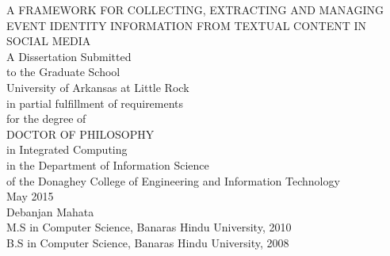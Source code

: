 \documentclass[12pt, oneside]{Thesis} %
\begin{document}
\begin{titlepage}
\begin{center}

\textsc{\large A FRAMEWORK FOR COLLECTING, EXTRACTING AND MANAGING EVENT IDENTITY INFORMATION FROM TEXTUAL CONTENT IN SOCIAL MEDIA}\\[1.5cm]


\large A Dissertation Submitted \\ to the Graduate School \\ University of Arkansas at Little Rock\\[1.5cm] %

in partial fulfillment of requirements \\ for the degree of \\[1.5cm]

\textsc{DOCTOR OF PHILOSOPHY}\\[1cm]

in Integrated Computing\\[1.5cm]

in the Department of Information Science \\ of the Donaghey College of Engineering and Information Technology \\[1.5cm]

May 2015 \\[1.5cm]

Debanjan Mahata \\
M.S in Computer Science, Banaras Hindu University, 2010 \\
B.S in Computer Science, Banaras Hindu University, 2008


\end{center}
\end{titlepage}
\end{document}
